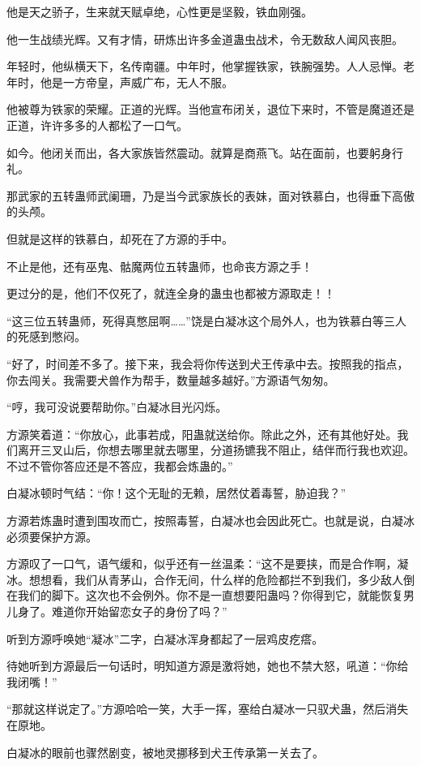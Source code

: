 \begin{this_body}
他是天之骄子，生来就天赋卓绝，心性更是坚毅，铁血刚强。

他一生战绩光辉。又有才情，研炼出许多金道蛊虫战术，令无数敌人闻风丧胆。

年轻时，他纵横天下，名传南疆。中年时，他掌握铁家，铁腕强势。人人忌惮。老年时，他是一方帝皇，声威广布，无人不服。

他被尊为铁家的荣耀。正道的光辉。当他宣布闭关，退位下来时，不管是魔道还是正道，许许多多的人都松了一口气。

如今。他闭关而出，各大家族皆然震动。就算是商燕飞。站在面前，也要躬身行礼。

那武家的五转蛊师武阑珊，乃是当今武家族长的表妹，面对铁慕白，也得垂下高傲的头颅。

但就是这样的铁慕白，却死在了方源的手中。

不止是他，还有巫鬼、骷魔两位五转蛊师，也命丧方源之手！

更过分的是，他们不仅死了，就连全身的蛊虫也都被方源取走！！

“这三位五转蛊师，死得真憋屈啊……”饶是白凝冰这个局外人，也为铁慕白等三人的死感到憋闷。

“好了，时间差不多了。接下来，我会将你传送到犬王传承中去。按照我的指点，你去闯关。我需要犬兽作为帮手，数量越多越好。”方源语气匆匆。

“哼，我可没说要帮助你。”白凝冰目光闪烁。

方源笑着道：“你放心，此事若成，阳蛊就送给你。除此之外，还有其他好处。我们离开三叉山后，你想去哪里就去哪里，分道扬镳我不阻止，结伴而行我也欢迎。不过不管你答应还是不答应，我都会炼蛊的。”

白凝冰顿时气结：“你！这个无耻的无赖，居然仗着毒誓，胁迫我？”

方源若炼蛊时遭到围攻而亡，按照毒誓，白凝冰也会因此死亡。也就是说，白凝冰必须要保护方源。

方源叹了一口气，语气缓和，似乎还有一丝温柔：“这不是要挟，而是合作啊，凝冰。想想看，我们从青茅山，合作无间，什么样的危险都拦不到我们，多少敌人倒在我们的脚下。这次也不会例外。你不是一直想要阳蛊吗？你得到它，就能恢复男儿身了。难道你开始留恋女子的身份了吗？”

听到方源呼唤她“凝冰”二字，白凝冰浑身都起了一层鸡皮疙瘩。

待她听到方源最后一句话时，明知道方源是激将她，她也不禁大怒，吼道：“你给我闭嘴！”

“那就这样说定了。”方源哈哈一笑，大手一挥，塞给白凝冰一只驭犬蛊，然后消失在原地。

白凝冰的眼前也骤然剧变，被地灵挪移到犬王传承第一关去了。


\end{this_body}
